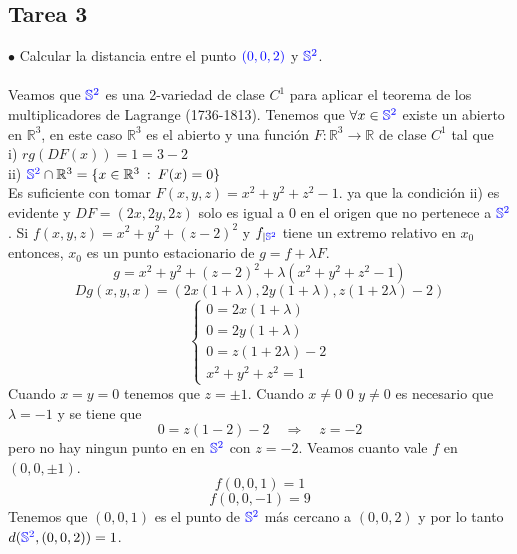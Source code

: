 \documentclass{article}
\newcommand{\bb}[1]{\mathbb{#1}}
\newcommand{\R}{\bb{R}}
\begin{document}
\begin{multicols}{2}
\section*{\textcolor{WildStrawberry}{Tarea 3}}
\noindent $\bullet$ Calcular la distancia entre el punto $\textcolor{blue}{(0,0,2)}$ y $\textcolor{blue}{\bb{S}^2}$.\\
\\
Veamos que $\textcolor{blue}{\bb{S}^2}$ es una 2-variedad de clase $C^1$ para aplicar el teorema de los multiplicadores de Lagrange (1736-1813). Tenemos que $\forall x \in \textcolor{blue}{\bb{S}^2}$ existe un abierto en $\bb{R}^3$, en este caso $\bb{R}^3$ es el abierto y una función $F:\bb{R}^3\rightarrow \R$ de clase $C^1$ tal que\\
i) $rg(DF(x))=1=3-2$\\
ii) $\textcolor{blue}{\bb{S}^2}\cap \bb{R}^3 = \{x\in \bb{R}^3 \::\: F(x)=0\}$\\
Es suficiente con tomar $F(x,y,z)= x^2+y^2+z^2-1$. ya que la condición ii) es evidente y $DF = (2x, 2y, 2z)$ solo es igual a 0 en el origen que no pertenece a $\textcolor{blue}{\bb{S}^2}$. Si $f(x,y,z)=x^2+y^2+(z-2)^2$ y $f_{|\textcolor{blue}{\bb{S}^2}}$ tiene un extremo relativo en $x_0$ entonces, $x_0$ es un punto estacionario de $g=f+\lambda F$.
$$
g = x^2+y^2+(z-2)^2 + \lambda (x^2+y^2+z^2-1)
$$
$$
Dg(x,y,x) = (2x(1+\lambda), 2y(1+\lambda), z(1+2\lambda)-2)
$$
$$
\left\{\begin{array}{l}
    0 = 2x(1+\lambda) \\
    0 = 2y(1+\lambda) \\
    0 = z(1+2\lambda)-2 \\
    x^2+y^2+z^2=1
\end{array}\right.
$$
Cuando $x=y=0$ tenemos que $z=\pm 1$. Cuando $x \ne 0$ 0 $y \ne 0$  es necesario que $\lambda = -1$ y se tiene que
$$
0 = z(1-2)-2 \quad \Rightarrow \quad z=-2
$$
pero no hay ningun punto en en $\textcolor{blue}{\bb{S}^2}$ con $z=-2$. Veamos cuanto vale $f$ en $(0,0,\pm 1)$.
$$
f(0,0,1) = 1
$$
$$
f(0,0,-1) = 9
$$
Tenemos que $(0,0,1)$ es el punto de $\textcolor{blue}{\bb{S}^2}$ más cercano a $(0,0,2)$ y por lo tanto $d(\textcolor{blue}{\bb{S}^2}, (0,0,2)) = 1$.


\end{multicols}
\end{document}
